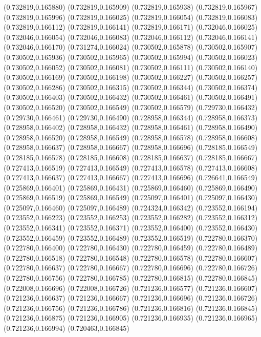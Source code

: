 (0.732819,0.165880)
(0.732819,0.165909)
(0.732819,0.165938)
(0.732819,0.165967)
(0.732819,0.165996)
(0.732819,0.166025)
(0.732819,0.166054)
(0.732819,0.166083)
(0.732819,0.166112)
(0.732819,0.166141)
(0.732819,0.166171)
(0.732046,0.166025)
(0.732046,0.166054)
(0.732046,0.166083)
(0.732046,0.166112)
(0.732046,0.166141)
(0.732046,0.166170)
(0.731274,0.166024)
(0.730502,0.165878)
(0.730502,0.165907)
(0.730502,0.165936)
(0.730502,0.165965)
(0.730502,0.165994)
(0.730502,0.166023)
(0.730502,0.166052)
(0.730502,0.166081)
(0.730502,0.166111)
(0.730502,0.166140)
(0.730502,0.166169)
(0.730502,0.166198)
(0.730502,0.166227)
(0.730502,0.166257)
(0.730502,0.166286)
(0.730502,0.166315)
(0.730502,0.166344)
(0.730502,0.166374)
(0.730502,0.166403)
(0.730502,0.166432)
(0.730502,0.166461)
(0.730502,0.166491)
(0.730502,0.166520)
(0.730502,0.166549)
(0.730502,0.166579)
(0.729730,0.166432)
(0.729730,0.166461)
(0.729730,0.166490)
(0.728958,0.166344)
(0.728958,0.166373)
(0.728958,0.166402)
(0.728958,0.166432)
(0.728958,0.166461)
(0.728958,0.166490)
(0.728958,0.166520)
(0.728958,0.166549)
(0.728958,0.166578)
(0.728958,0.166608)
(0.728958,0.166637)
(0.728958,0.166667)
(0.728958,0.166696)
(0.728185,0.166549)
(0.728185,0.166578)
(0.728185,0.166608)
(0.728185,0.166637)
(0.728185,0.166667)
(0.727413,0.166519)
(0.727413,0.166549)
(0.727413,0.166578)
(0.727413,0.166608)
(0.727413,0.166637)
(0.727413,0.166667)
(0.727413,0.166696)
(0.726641,0.166549)
(0.725869,0.166401)
(0.725869,0.166431)
(0.725869,0.166460)
(0.725869,0.166490)
(0.725869,0.166519)
(0.725869,0.166549)
(0.725097,0.166401)
(0.725097,0.166430)
(0.725097,0.166460)
(0.725097,0.166489)
(0.724324,0.166342)
(0.723552,0.166194)
(0.723552,0.166223)
(0.723552,0.166253)
(0.723552,0.166282)
(0.723552,0.166312)
(0.723552,0.166341)
(0.723552,0.166371)
(0.723552,0.166400)
(0.723552,0.166430)
(0.723552,0.166459)
(0.723552,0.166489)
(0.723552,0.166519)
(0.722780,0.166370)
(0.722780,0.166400)
(0.722780,0.166430)
(0.722780,0.166459)
(0.722780,0.166489)
(0.722780,0.166518)
(0.722780,0.166548)
(0.722780,0.166578)
(0.722780,0.166607)
(0.722780,0.166637)
(0.722780,0.166667)
(0.722780,0.166696)
(0.722780,0.166726)
(0.722780,0.166756)
(0.722780,0.166785)
(0.722780,0.166815)
(0.722780,0.166845)
(0.722008,0.166696)
(0.722008,0.166726)
(0.721236,0.166577)
(0.721236,0.166607)
(0.721236,0.166637)
(0.721236,0.166667)
(0.721236,0.166696)
(0.721236,0.166726)
(0.721236,0.166756)
(0.721236,0.166786)
(0.721236,0.166816)
(0.721236,0.166845)
(0.721236,0.166875)
(0.721236,0.166905)
(0.721236,0.166935)
(0.721236,0.166965)
(0.721236,0.166994)
(0.720463,0.166845)

